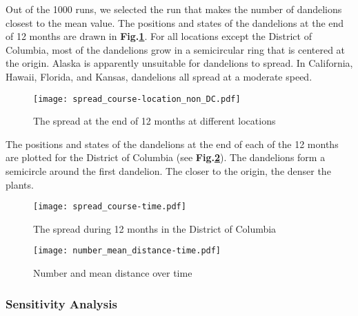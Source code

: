\documentclass[12pt]{article}
\begin{document}
			Out of the 1000 runs, we selected the run that makes the number of dandelions closest to the mean value.  The positions and states of the dandelions at the end of 12 months are drawn in \textbf{Fig.\ref{fig:scatter5loc}}.  For all locations except the District of Columbia, most of the dandelions grow in a semicircular ring that is centered at the origin.  Alaska is apparently unsuitable for dandelions to spread.  In California, Hawaii, Florida, and Kansas, dandelions all spread at a moderate speed.
			
			\begin{figure}
				\centering
				\texttt{[image: spread\_course-location\_non\_DC.pdf]}
				\caption{The spread at the end of 12 months at different locations}
				\label{fig:scatter5loc}
			\end{figure}
			
			The positions and states of the dandelions at the end of each of the 12 months are plotted for the District of Columbia (see \textbf{Fig.\ref{fig:spreadDC}}).  The dandelions form a semicircle around the first dandelion.  The closer to the origin, the denser the plants.
			
			\begin{figure}
				\centering
				\texttt{[image: spread\_course-time.pdf]}
				\caption{The spread during 12 months in the District of Columbia}
				\label{fig:spreadDC}
			\end{figure}
					
			\begin{figure}
				\centering
				\texttt{[image: number\_mean\_distance-time.pdf]}
				\caption{Number and mean distance over time}
				\label{fig:time}
			\end{figure}
		
		\subsubsection{Sensitivity Analysis}
		
\end{document}
